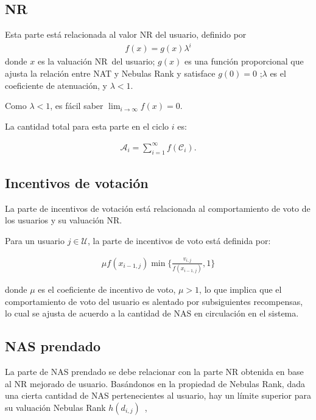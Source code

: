 \subsection{NR}
Esta parte está relacionada al valor NR del usuario, definido por
\begin{align}
    f(x) = g(x)\lambda^i
\end{align}
\noindent donde $x$ es la valuación NR del usuario; $g(x)$ es una función proporcional que ajusta la relación entre NAT y Nebulas Rank y satisface $g(0) = 0$ ;$\lambda$ es el coeficiente de atenuación, y $\lambda < 1$.

Como $\lambda < 1$, es fácil saber $\lim_{i\to \infty}f(x) = 0$.

La cantidad total para esta parte en el ciclo $i$ es:

\begin{align}
\mathcal{A}_i = \sum_{i=1}^{\infty}f(\mathcal{C}_i).
\end{align}

\subsection{Incentivos de votación}

La parte de incentivos de votación está relacionada al comportamiento de voto de los usuarios y su valuación NR.

Para un usuario $j \in \mathcal{U}$, la parte de incentivos de voto está definida por:

\begin{align}
\mu f(x_{i-1,j}) \min\{\frac{v_{i,j}}{f(x_{i-1,j})},1\}
\end{align}

\noindent donde $\mu$ es el coeficiente de incentivo de voto, $\mu > 1$, lo que implica que el comportamiento de voto del usuario es alentado por subsiguientes recompensas, lo cual se ajusta de acuerdo a la cantidad de NAS en circulación en el sistema.

\subsection{NAS prendado}

La parte de NAS prendado se debe relacionar con la parte NR obtenida en base al NR mejorado de usuario. Basándonos en la propiedad de Nebulas Rank, dada una cierta cantidad de NAS pertenecientes al usuario, hay un límite superior para su valuación Nebulas Rank $h(d_{i,j})$~\cite{ImproveNR},

